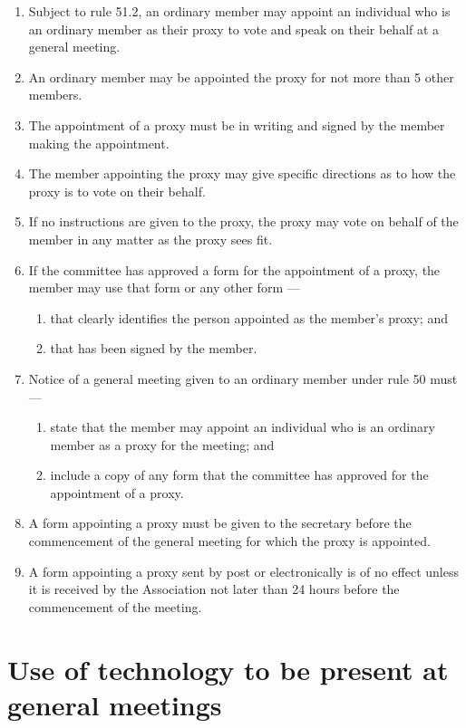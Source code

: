 \begin{enumerate}

\item Subject to rule 51.2, an ordinary member may appoint an individual who is an ordinary member as their proxy to vote and speak on their behalf at a general meeting.
\item An ordinary member may be appointed the proxy for not more than 5 other members.
\item The appointment of a proxy must be in writing and signed by the member making the appointment.
\item The member appointing the proxy may give specific directions as to how the proxy is to vote on their behalf.
\item If no instructions are given to the proxy, the proxy may vote on behalf of the member in any matter as the proxy sees fit.
\item If the committee has approved a form for the appointment of a proxy, the member may use that form or any other form ---

  \begin{enumerate}
  
  \item that clearly identifies the person appointed as the member's proxy; and
  \item that has been signed by the member.
  \end{enumerate}
\item Notice of a general meeting given to an ordinary member under rule 50 must ---

  \begin{enumerate}
  
  \item state that the member may appoint an individual who is an ordinary member as a proxy for the meeting; and
  \item include a copy of any form that the committee has approved for the appointment of a proxy.
  \end{enumerate}
\item A form appointing a proxy must be given to the secretary before the commencement of the general meeting for which the proxy is appointed.
\item A form appointing a proxy sent by post or electronically is of no effect unless it is received by the Association not later than 24 hours before the commencement of the meeting.
\end{enumerate}

\hypertarget{use-of-technology-to-be-present-at-general-meetings}{%
\section{Use of technology to be present at general meetings}\label{use-of-technology-to-be-present-at-general-meetings}}

